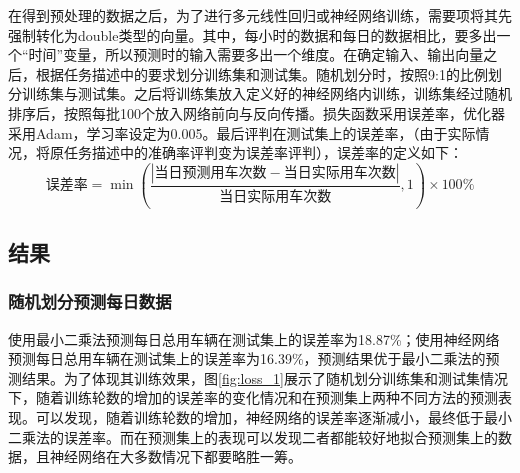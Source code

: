\documentclass[CJK]{ctexart}
\begin{document}
在得到预处理的数据之后，为了进行多元线性回归或神经网络训练，需要项将其先强制转化为double类型的向量。其中，每小时的数据和每日的数据相比，要多出一个“时间”变量，所以预测时的输入需要多出一个维度。在确定输入、输出向量之后，根据任务描述中的要求划分训练集和测试集。随机划分时，按照9:1的比例划分训练集与测试集。之后将训练集放入定义好的神经网络内训练，训练集经过随机排序后，按照每批100个放入网络前向与反向传播。损失函数采用误差率，优化器采用Adam，学习率设定为0.005。最后评判在测试集上的误差率，（由于实际情况，将原任务描述中的准确率评判变为误差率评判），误差率的定义如下：
$$\mbox{误差率}=\min(\frac{|\mbox{当日预测用车次数}-\mbox{当日实际用车次数}|}{\mbox{当日实际用车次数}},1)\times 100\%$$
\subsection{结果}
\subsubsection{随机划分预测每日数据}
使用最小二乘法预测每日总用车辆在测试集上的误差率为18.87\%；使用神经网络预测每日总用车辆在测试集上的误差率为16.39\%，预测结果优于最小二乘法的预测结果。为了体现其训练效果，图\ref{fig:loss_1}展示了随机划分训练集和测试集情况下，随着训练轮数的增加的误差率的变化情况和在预测集上两种不同方法的预测表现。可以发现，随着训练轮数的增加，神经网络的误差率逐渐减小，最终低于最小二乘法的误差率。而在预测集上的表现可以发现二者都能较好地拟合预测集上的数据，且神经网络在大多数情况下都要略胜一筹。
\end{document}
